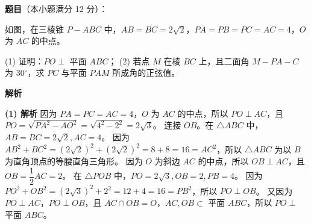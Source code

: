 \begin{answer}

\textbf{题目}（本小题满分 12 分）：

如图，在三棱锥 $P-ABC$ 中，$AB=BC=2\sqrt2$，$PA=PB=PC=AC=4$，$O$ 为 $AC$ 的中点。
\nopagebreak[4]
\begin{center}\end{center}
\nopagebreak[4]
(1) 证明：$PO\perp$ 平面 $ABC$；
(2) 若点 $M$ 在棱 $BC$ 上，且二面角 $M-PA-C$ 为 $30^\circ$，求 $PC$ 与平面 $PAM$ 所成角的正弦值。

\textbf{解析}

\textbf{(1) 解析} 因为 $PA=PC=AC=4$，$O$ 为 $AC$ 的中点，所以 $PO\perp AC$，且 $PO = \sqrt{PA^2-AO^2} = \sqrt{4^2-2^2} = 2\sqrt3$。
连接 $OB$。在 $\triangle ABC$ 中，$AB=BC=2\sqrt2, AC=4$。
因为 $AB^2+BC^2 = (2\sqrt2)^2+(2\sqrt2)^2 = 8+8=16=AC^2$，所以 $\triangle ABC$ 为以 $B$ 为直角顶点的等腰直角三角形。
因为 $O$ 为斜边 $AC$ 的中点，所以 $OB\perp AC$，且 $OB = \dfrac12 AC = 2$。
在 $\triangle POB$ 中，$PO=2\sqrt3, OB=2, PB=4$。
因为 $PO^2+OB^2 = (2\sqrt3)^2+2^2 = 12+4=16=PB^2$，所以 $PO\perp OB$。
又因为 $PO\perp AC$，$PO\perp OB$，且 $AC\cap OB=O$，$AC,OB\subset$ 平面 $ABC$，所以 $PO\perp$ 平面 $ABC$。


\end{answer}
